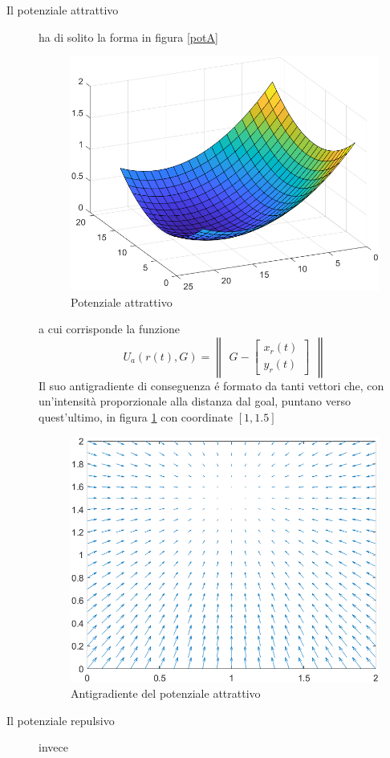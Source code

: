 \documentclass[14pt,twoside,a4paper]{extarticle}
\begin{document}
\begin{description}
\item[Il potenziale attrattivo] ha di solito la forma in figura \ref{potA}
\begin{figure}[H]
\caption{Potenziale attrattivo}
\includegraphics[width=\textwidth]{potA.png}
\end{figure} 
a cui corrisponde la funzione \[U_a(r(t),G) = \begin{Vmatrix}G - \begin{bmatrix} x_r(t)\\ y_r(t) \end{bmatrix}\end{Vmatrix}\]
Il suo antigradiente di conseguenza é formato da tanti vettori che, con un'intensità proporzionale alla distanza dal goal, puntano verso quest'ultimo, in figura \ref{antigradA} con coordinate \([1,1.5]\)
\begin{figure}[H]
\caption{Antigradiente del potenziale attrattivo}
\label{antigradA}
\includegraphics[width=\textwidth]{antigradA.png}
\end{figure}
\item[Il potenziale repulsivo] invece 
\end{description} 
\end{document}
